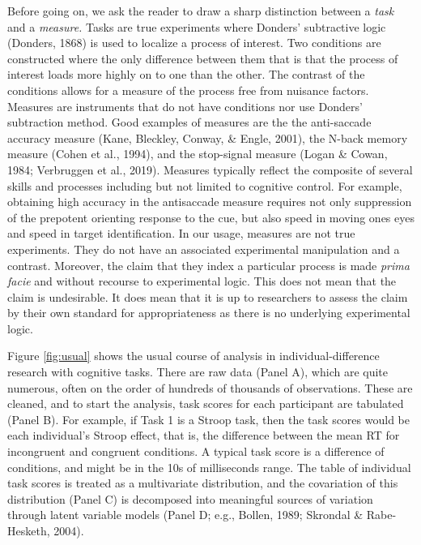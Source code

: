 \documentclass[
  english,
  ,man]{apa6}
\begin{document}
Before going on, we ask the reader to draw a sharp distinction between a \emph{task} and a \emph{measure.} Tasks are true experiments where Donders' subtractive logic (Donders, 1868) is used to localize a process of interest. Two conditions are constructed where the only difference between them that is that the process of interest loads more highly on to one than the other. The contrast of the conditions allows for a measure of the process free from nuisance factors. Measures are instruments that do not have conditions nor use Donders' subtraction method. Good examples of measures are the the anti-saccade accuracy measure (Kane, Bleckley, Conway, \& Engle, 2001), the N-back memory measure (Cohen et al., 1994), and the stop-signal measure (Logan \& Cowan, 1984; Verbruggen et al., 2019). Measures typically reflect the composite of several skills and processes including but not limited to cognitive control. For example, obtaining high accuracy in the antisaccade measure requires not only suppression of the prepotent orienting response to the cue, but also speed in moving ones eyes and speed in target identification. In our usage, measures are not true experiments. They do not have an associated experimental manipulation and a contrast. Moreover, the claim that they index a particular process is made \emph{prima facie} and without recourse to experimental logic. This does not mean that the claim is undesirable. It does mean that it is up to researchers to assess the claim by their own standard for appropriateness as there is no underlying experimental logic.

Figure \ref{fig:usual} shows the usual course of analysis in individual-difference research with cognitive tasks. There are raw data (Panel A), which are quite numerous, often on the order of hundreds of thousands of observations. These are cleaned, and to start the analysis, task scores for each participant are tabulated (Panel B). For example, if Task 1 is a Stroop task, then the task scores would be each individual's Stroop effect, that is, the difference between the mean RT for incongruent and congruent conditions. A typical task score is a difference of conditions, and might be in the 10s of milliseconds range. The table of individual task scores is treated as a multivariate distribution, and the covariation of this distribution (Panel C) is decomposed into meaningful sources of variation through latent variable models (Panel D; e.g., Bollen, 1989; Skrondal \& Rabe-Hesketh, 2004).
\end{document}
